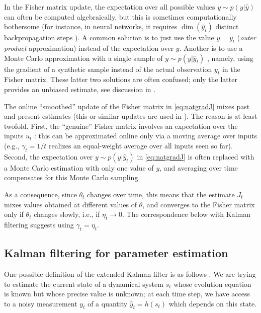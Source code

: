 \documentclass[11pt,a4paper]{article}
\newcommand{\1}{\mathbbm{1}}
\theoremstyle{yannthm}
\theoremstyle{yannthm2}
\numberwithin{equation}{section}
\begin{document}
In the Fisher matrix update, the expectation over all possible values
$y\sim p(y|\hat y)$ can often be computed algebraically, but this is
sometimes computationally bothersome (for instance, in neural networks,
it requires $\dim(\hat y_t)$ distinct backpropagation steps \cite{gradnn}). A
common solution \cite{APF00,TONGA,gradnn,PB13} is to just use the value $y=y_t$ (\emph{outer
product} approximation) instead of the expectation over $y$. Another is to use a
Monte Carlo approximation with a single sample of $y\sim p(y|\hat y_t)$
\cite{gradnn,riemaNN}, namely, using the gradient of a synthetic sample
instead of the actual observation $y_t$ in the Fisher matrix. These
latter two solutions are often confused; only the latter provides an
unbiased estimate, see discussion in \cite{gradnn,PB13}.

The online ``smoothed'' update of the Fisher matrix in
\eqref{eq:natgradJ} mixes past and present estimates (this or similar
updates are used in \cite{TONGA,riemaNN}). The reason is at least
twofold. First, the ``genuine'' Fisher matrix involves an
expectation over the inputs $u_t$ \cite[\S8.2]{Amari2000book}: this can be approximated online only
via a moving average over inputs (e.g., $\gamma_t=1/t$ realizes an
equal-weight average over all inputs seen so far).
Second, the expectation over $y\sim p(y|\hat y_t)$ in \eqref{eq:natgradJ}
is often replaced with a Monte Carlo estimation with only one value of
$y$, and averaging over time compensates for this Monte Carlo sampling.

As a consequence, since $\theta_t$ changes over time, this means that the
estimate $J_t$ mixes values obtained at different values of $\theta$, and
converges to the Fisher matrix only if $\theta_t$ changes slowly, i.e.,
if $\eta_t\to 0$.  The correspondence below with Kalman filtering
suggests using $\gamma_t=\eta_t$.

\subsection{Kalman filtering for parameter estimation}
\label{sec:kalman}

One possible definition of the extended Kalman filter is as follows
\cite[\S15.1]{simon2006kalmanbook}. We
are trying to estimate the current state of a dynamical system $s_t$
whose evolution equation is known but whose precise value is unknown; at
each time step, we have access to a noisy measurement $y_t$ of a quantity
$\hat y_t=h(s_t)$ which depends on this state.
\end{document}

